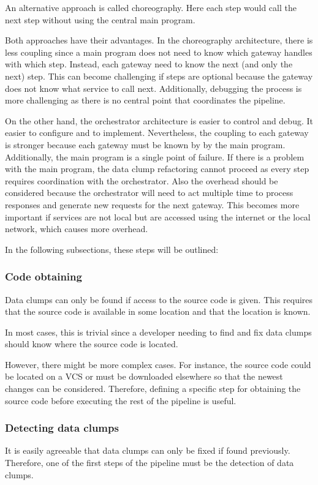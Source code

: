 An alternative approach is called choreography. Here each step would call the next step without using the central main program. 

Both approaches have their advantages. In the choreography architecture, there is less coupling since a main program does not need to know which gateway handles with which step. Instead, each gateway need to know the next (and only the next) step. This can become challenging if steps are optional because the gateway does not know what service to call next. Additionally, debugging the process is more challenging as there is no central point that coordinates the pipeline.

On the other hand, the orchestrator architecture is easier to control and debug. It easier to configure and to implement. Nevertheless, the coupling to each gateway is stronger because each gateway must be known by by the main program. Additionally, the main program is a single point of failure. If there is a problem with the main program, the data clump refactoring cannot proceed as every step requires coordination with the orchestrator. Also the overhead should be considered because the orchestrator will need to act multiple time to process responses and generate new requests for the next gateway. This becomes more important if services are not local but are accessed using the internet or the local network, which causes more overhead. \cite{orchestration_choreography}

In the following subsections, these steps will be outlined:
\subsubsection{Code obtaining}\label{sec:code_obtaining}
Data clumps can only be found if access to the source code is given. This requires that the source code is available in some location and that the location is known.

In most cases, this is trivial since a developer needing to find and fix data clumps should know where the source code is located.

However, there might be more complex cases. For instance, the source code could be located on a \ac{VCS} or must be downloaded elsewhere so that the newest changes can be considered. Therefore, defining a specific step for obtaining the source code before executing the rest of the pipeline is useful. 
\subsubsection{Detecting data clumps}\label{subsec:chap3_data_clump_detection}
It is easily agreeable that data clumps can only be fixed if found previously. Therefore, one of the first steps of the pipeline must be the detection of data clumps. 

